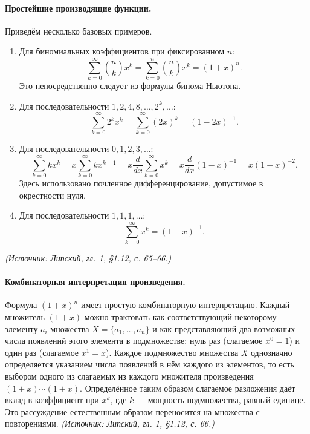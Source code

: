 \documentclass[a4paper,12pt]{article}
\begin{document}
\paragraph{Простейшие производящие функции.}
Приведём несколько базовых примеров.
\begin{enumerate}[label=\arabic*)]
\item Для биномиальных коэффициентов при фиксированном \(n\):
\[
\sum_{k=0}^{\infty}\binom{n}{k}x^k=\sum_{k=0}^{n}\binom{n}{k}x^k=(1+x)^n.
\]
Это непосредственно следует из формулы бинома Ньютона.
\item Для последовательности \(1,2,4,8,\dots,2^k,\dots\):
\[
\sum_{k=0}^{\infty}2^kx^k=\sum_{k=0}^{\infty}(2x)^k=(1-2x)^{-1}.
\]
\item Для последовательности \(0,1,2,3,\dots\):
\[
\sum_{k=0}^{\infty}kx^k=x\sum_{k=0}^{\infty}kx^{k-1}=x\frac{d}{dx}\sum_{k=0}^{\infty}x^k=x\frac{d}{dx}(1-x)^{-1}=x(1-x)^{-2}.
\]
Здесь использовано почленное дифференцирование, допустимое в окрестности нуля.
\item Для последовательности \(1,1,1,\dots\):
\[
\sum_{k=0}^{\infty}x^k=(1-x)^{-1}.
\]
\end{enumerate}
\textit{(Источник: Липский, гл. 1, §1.12, с. 65--66.)}

\paragraph{Комбинаторная интерпретация произведения.}
Формула \((1+x)^n\) имеет простую комбинаторную интерпретацию. Каждый множитель \((1+x)\) можно трактовать как соответствующий некоторому элементу \(a_i\) множества \(X=\{a_1,\dots,a_n\}\) и как представляющий два возможных числа появлений этого элемента в подмножестве: нуль раз (слагаемое \(x^0=1\)) и один раз (слагаемое \(x^1=x\)). Каждое подмножество множества \(X\) однозначно определяется указанием числа появлений в нём каждого из элементов, то есть выбором одного из слагаемых из каждого множителя произведения \((1+x)\cdots(1+x)\). Определённое таким образом слагаемое разложения даёт вклад в коэффициент при \(x^k\), где \(k\) --- мощность подмножества, равный единице. Это рассуждение естественным образом переносится на множества с повторениями.
\textit{(Источник: Липский, гл. 1, §1.12, с. 66.)}
\end{document}
